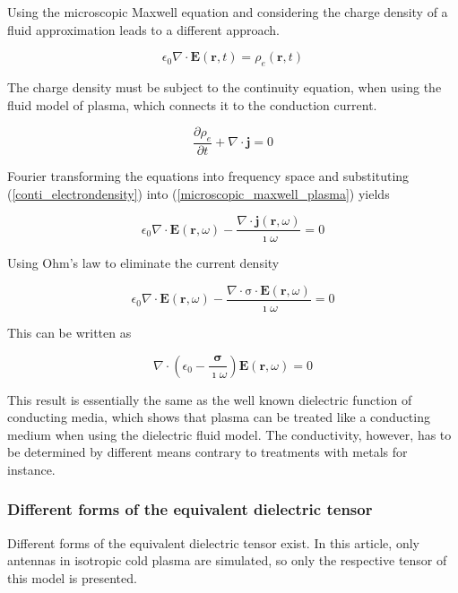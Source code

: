 \documentclass[draft,ras]{agutex}
\begin{document}
\begin{article}
Using the microscopic Maxwell equation and considering the charge density of a fluid approximation leads to a different approach.

\begin{equation}\label{microscopic_maxwell_plasma}
    \epsilon_0 \nabla \cdot \mathbf{E}(\mathbf{r},t)=\rho_e(\mathbf{r},t)
\end{equation}

The charge density must be subject to the continuity equation, when using the fluid model of plasma, which connects it to the conduction current.

\begin{equation}\label{conti_electrondensity}
    \frac{\partial \rho_e}{\partial t} + \nabla \cdot \mathbf{j}=0
\end{equation}

Fourier transforming the equations into frequency space and substituting (\ref{conti_electrondensity}) into (\ref{microscopic_maxwell_plasma}) yields

\begin{equation}
    \epsilon_0  \nabla \cdot \mathbf{E}(\mathbf{r},\omega)-\frac{\nabla \cdot \mathbf{j}(\mathbf{r},\omega)}{\imath \omega}=0
\end{equation}

Using Ohm's law to eliminate the current density

\begin{equation}
    \epsilon_0  \nabla \cdot \mathbf{E}(\mathbf{r},\omega)-\frac{\nabla \cdot \mathrm{\sigma } \cdot \mathbf{E}(\mathbf{r},\omega)}{\imath \omega}=0
\end{equation}

This can be written as

\begin{equation}
    \nabla \cdot \left( \epsilon_0 -\frac{\mathbf{\sigma } }{\imath \omega}  \right) \mathbf{E}(\mathbf{r},\omega)=0
\end{equation}

This result is essentially the same as the well known dielectric function of conducting media, which shows that plasma can be treated like a conducting medium when using the dielectric fluid model. The conductivity, however, has to be determined by different means contrary to treatments with metals for instance.\\

\subsubsection{Different forms of the equivalent dielectric tensor}
Different forms of the equivalent dielectric tensor exist. In this article, only antennas in isotropic cold plasma are simulated, so only the respective tensor of this model is presented.\\


\end{article}
\end{document}
